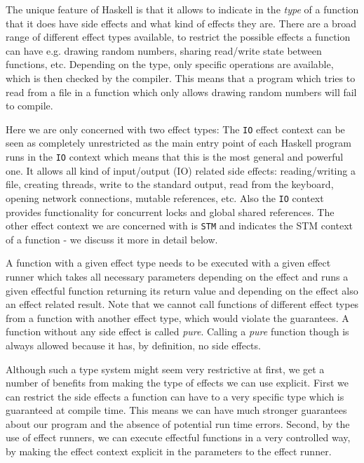 The unique feature of Haskell is that it allows to indicate in the \textit{type} of a function that it does have side effects and what kind of effects they are. There are a broad range of different effect types available, to restrict the possible effects a function can have e.g. drawing random numbers, sharing read/write state between functions, etc. Depending on the type, only specific operations are available, which is then checked by the compiler. This means that a program which tries to read from a file in a function which only allows drawing random numbers will fail to compile.

Here we are only concerned with two effect types: The \texttt{IO} effect context can be seen as completely unrestricted as the main entry point of each Haskell program runs in the \texttt{IO} context which means that this is the most general and powerful one. It allows all kind of input/output (IO) related side effects: reading/writing a file, creating threads, write to the standard output, read from the keyboard, opening network connections, mutable references, etc. Also the \texttt{IO} context provides functionality for concurrent locks and global shared references. The other effect context we are concerned with is \texttt{STM} and indicates the STM context of a function - we discuss it more in detail below. 

A function with a given effect type needs to be executed with a given effect runner which takes all necessary parameters depending on the effect and runs a given effectful function returning its return value and depending on the effect also an effect related result. Note that we cannot call functions of different effect types from a function with another effect type, which would violate the guarantees. A function without any side effect is called \textit{pure}. Calling a \textit{pure} function though is always allowed because it has, by definition, no side effects. 

Although such a type system might seem very restrictive at first, we get a number of benefits from making the type of effects we can use explicit. First we can restrict the side effects a function can have to a very specific type which is guaranteed at compile time. This means we can have much stronger guarantees about our program and the absence of potential run time errors. Second, by the use of effect runners, we can execute effectful functions in a very controlled way, by making the effect context explicit in the parameters to the effect runner.

